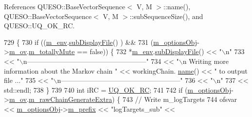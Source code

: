 References Q\-U\-E\-S\-O\-::\-Base\-Vector\-Sequence$<$ V, M $>$\-::name(), Q\-U\-E\-S\-O\-::\-Base\-Vector\-Sequence$<$ V, M $>$\-::sub\-Sequence\-Size(), and Q\-U\-E\-S\-O\-::\-U\-Q\-\_\-\-O\-K\-\_\-\-R\-C.


\begin{DoxyCode}
729 \{
730   \textcolor{keywordflow}{if} ((\hyperlink{class_q_u_e_s_o_1_1_metropolis_hastings_s_g_ac8ea061e55b920e0c8f9bce5c3f20e52}{m\_env}.\hyperlink{class_q_u_e_s_o_1_1_base_environment_a8a0064746ae8dddfece4229b9ad374d6}{subDisplayFile}()                   ) &&
731       (\hyperlink{class_q_u_e_s_o_1_1_metropolis_hastings_s_g_a5d0bc9f73d50d272aa6bfb5ef5939ef3}{m\_optionsObj}->\hyperlink{class_q_u_e_s_o_1_1_metropolis_hastings_s_g_options_a9d4792d9fc2dc5439b8ab489b0c236eb}{m\_ov}.\hyperlink{class_q_u_e_s_o_1_1_mh_options_values_af812309e81191e88dfdc87c5815141a3}{m\_totallyMute} == \textcolor{keyword}{false})) \{
732     *\hyperlink{class_q_u_e_s_o_1_1_metropolis_hastings_s_g_ac8ea061e55b920e0c8f9bce5c3f20e52}{m\_env}.\hyperlink{class_q_u_e_s_o_1_1_base_environment_a8a0064746ae8dddfece4229b9ad374d6}{subDisplayFile}() << \textcolor{stringliteral}{"\(\backslash\)n"}
733                             << \textcolor{stringliteral}{"\(\backslash\)n-----------------------------------------------------"}
734                             << \textcolor{stringliteral}{"\(\backslash\)n Writing more information about the Markov chain "} << workingChain.
      \hyperlink{class_q_u_e_s_o_1_1_base_vector_sequence_a48f6fe02cf77f4233d3bcdfef3870f19}{name}() << \textcolor{stringliteral}{" to output file ..."}
735                             << \textcolor{stringliteral}{"\(\backslash\)n-----------------------------------------------------"}
736                             << \textcolor{stringliteral}{"\(\backslash\)n"}
737                             << std::endl;
738   \}
739 
740   \textcolor{keywordtype}{int} iRC = \hyperlink{namespace_q_u_e_s_o_a8e909502900aecf24cedba022ea84471}{UQ\_OK\_RC};
741 
742   \textcolor{keywordflow}{if} (\hyperlink{class_q_u_e_s_o_1_1_metropolis_hastings_s_g_a5d0bc9f73d50d272aa6bfb5ef5939ef3}{m\_optionsObj}->\hyperlink{class_q_u_e_s_o_1_1_metropolis_hastings_s_g_options_a9d4792d9fc2dc5439b8ab489b0c236eb}{m\_ov}.\hyperlink{class_q_u_e_s_o_1_1_mh_options_values_a9d540978290d39df801e32f183450859}{m\_rawChainGenerateExtra}) \{
743     \textcolor{comment}{// Write m\_logTargets}
744     ofsvar << \hyperlink{class_q_u_e_s_o_1_1_metropolis_hastings_s_g_a5d0bc9f73d50d272aa6bfb5ef5939ef3}{m\_optionsObj}->\hyperlink{class_q_u_e_s_o_1_1_metropolis_hastings_s_g_options_a4f7c510aaa530336d24259e2a89f5d0b}{m\_prefix} << \textcolor{stringliteral}{"logTargets\_sub"} << 

\end{DoxyCode}
